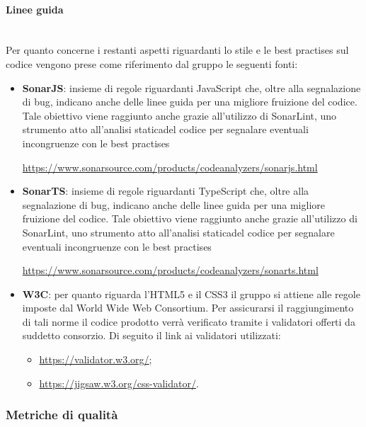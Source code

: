 			\paragraph*{Linee guida}\mbox{}\\ [1mm]
			Per quanto concerne i restanti aspetti riguardanti lo stile e le best practises sul codice vengono prese come riferimento dal gruppo le seguenti fonti:
			\begin{itemize}
				\item \textbf{SonarJS}: insieme di regole riguardanti JavaScript che, oltre alla segnalazione di bug, indicano anche delle linee guida per una migliore fruizione del codice. Tale obiettivo viene raggiunto anche grazie all'utilizzo di SonarLint, uno strumento atto all'analisi statica\glosp del codice per segnalare eventuali incongruenze con le best practises
				\begin{center}
				\url{https://www.sonarsource.com/products/codeanalyzers/sonarjs.html}
				\end{center}	
				\item \textbf{SonarTS}: insieme di regole riguardanti TypeScript che, oltre alla segnalazione di bug, indicano anche delle linee guida per una migliore fruizione del codice. Tale obiettivo viene raggiunto anche grazie all'utilizzo di SonarLint, uno strumento atto all'analisi statica\glosp del codice per segnalare eventuali incongruenze con le best practises
				\begin{center}
				\url{https://www.sonarsource.com/products/codeanalyzers/sonarts.html}
				\end{center}
				\item \textbf{W3C}: per quanto riguarda l'HTML5 e il CSS3 il gruppo si attiene alle regole imposte dal World Wide Web Consortium. Per assicurarsi il raggiungimento di tali norme il codice prodotto verrà verificato tramite i validatori offerti da suddetto consorzio. Di seguito il link ai validatori utilizzati:
				\begin{itemize}
					\item \url{https://validator.w3.org/};
					\item \url{https://jigsaw.w3.org/css-validator/}.
				\end{itemize}
			\end{itemize}
		
	\subsubsection{Metriche di qualità}
